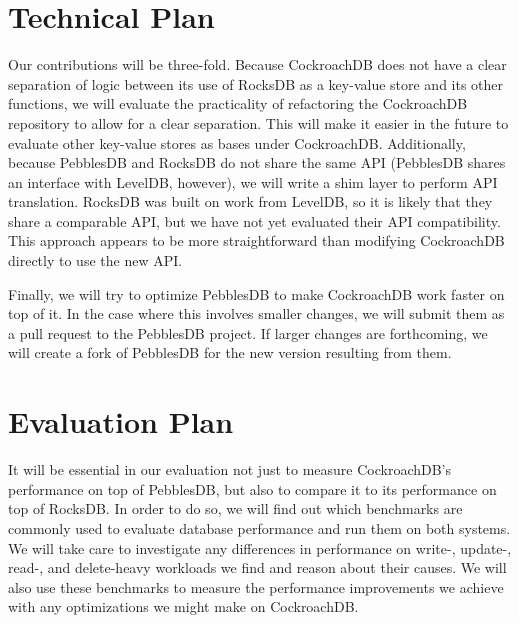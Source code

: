 \documentclass[10pt,twocolumn,letterpaper]{article}
\begin{document}

\section{Technical Plan}
Our contributions will be three-fold. Because CockroachDB does not have a clear separation of logic between its use of RocksDB as a key-value store and its other functions, we will evaluate the practicality of refactoring the CockroachDB repository to allow for a clear separation. This will make it easier in the future to evaluate other key-value stores as bases under CockroachDB. Additionally, because PebblesDB and RocksDB do not share the same API (PebblesDB shares an interface with LevelDB, however), we will write a shim layer to perform API translation. RocksDB was built on work from LevelDB, so it is likely that they share a comparable API, but we have not yet evaluated their API compatibility. This approach appears to be more straightforward than modifying CockroachDB directly to use the new API.\par
Finally, we will try to optimize PebblesDB to make CockroachDB work faster on top of it. In the case where this involves smaller changes, we will submit them as a pull request to the PebblesDB project. If larger changes are forthcoming, we will create a fork of PebblesDB for the new version resulting from them.


\section{Evaluation Plan}
It will be essential in our evaluation not just to measure CockroachDB's performance on top of PebblesDB, but also to compare it to its performance on top of RocksDB. In order to do so, we will find out which benchmarks are commonly used to evaluate database performance and run them on both systems. We will take care to investigate any differences in performance on write-, update-, read-, and delete-heavy workloads we find and reason about their causes. We will also use these benchmarks to measure the performance improvements we achieve with any optimizations we might make on CockroachDB.

\end{document}
